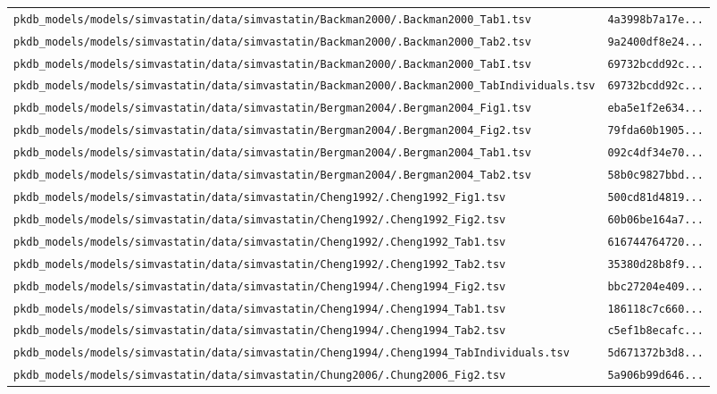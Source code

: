 \documentclass{article}
\begin{document}
\begin{longtable}{ll}
\texttt{pkdb\_models/models/simvastatin/data/simvastatin/Backman2000/.Backman2000\_Tab1.tsv} & \texttt{4a3998b7a17e...} \\
\texttt{pkdb\_models/models/simvastatin/data/simvastatin/Backman2000/.Backman2000\_Tab2.tsv} & \texttt{9a2400df8e24...} \\
\texttt{pkdb\_models/models/simvastatin/data/simvastatin/Backman2000/.Backman2000\_TabI.tsv} & \texttt{69732bcdd92c...} \\
\texttt{pkdb\_models/models/simvastatin/data/simvastatin/Backman2000/.Backman2000\_TabIndividuals.tsv} & \texttt{69732bcdd92c...} \\
\texttt{pkdb\_models/models/simvastatin/data/simvastatin/Bergman2004/.Bergman2004\_Fig1.tsv} & \texttt{eba5e1f2e634...} \\
\texttt{pkdb\_models/models/simvastatin/data/simvastatin/Bergman2004/.Bergman2004\_Fig2.tsv} & \texttt{79fda60b1905...} \\
\texttt{pkdb\_models/models/simvastatin/data/simvastatin/Bergman2004/.Bergman2004\_Tab1.tsv} & \texttt{092c4df34e70...} \\
\texttt{pkdb\_models/models/simvastatin/data/simvastatin/Bergman2004/.Bergman2004\_Tab2.tsv} & \texttt{58b0c9827bbd...} \\
\texttt{pkdb\_models/models/simvastatin/data/simvastatin/Cheng1992/.Cheng1992\_Fig1.tsv} & \texttt{500cd81d4819...} \\
\texttt{pkdb\_models/models/simvastatin/data/simvastatin/Cheng1992/.Cheng1992\_Fig2.tsv} & \texttt{60b06be164a7...} \\
\texttt{pkdb\_models/models/simvastatin/data/simvastatin/Cheng1992/.Cheng1992\_Tab1.tsv} & \texttt{616744764720...} \\
\texttt{pkdb\_models/models/simvastatin/data/simvastatin/Cheng1992/.Cheng1992\_Tab2.tsv} & \texttt{35380d28b8f9...} \\
\texttt{pkdb\_models/models/simvastatin/data/simvastatin/Cheng1994/.Cheng1994\_Fig2.tsv} & \texttt{bbc27204e409...} \\
\texttt{pkdb\_models/models/simvastatin/data/simvastatin/Cheng1994/.Cheng1994\_Tab1.tsv} & \texttt{186118c7c660...} \\
\texttt{pkdb\_models/models/simvastatin/data/simvastatin/Cheng1994/.Cheng1994\_Tab2.tsv} & \texttt{c5ef1b8ecafc...} \\
\texttt{pkdb\_models/models/simvastatin/data/simvastatin/Cheng1994/.Cheng1994\_TabIndividuals.tsv} & \texttt{5d671372b3d8...} \\
\texttt{pkdb\_models/models/simvastatin/data/simvastatin/Chung2006/.Chung2006\_Fig2.tsv} & \texttt{5a906b99d646...} \\

\end{longtable}
\end{document}
